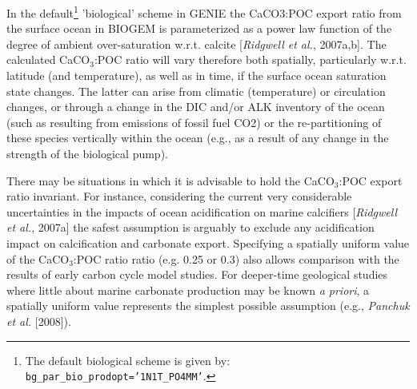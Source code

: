 \documentclass[11pt,fleqn]{book} %
\begin{document}
In the default\footnote{The default biological scheme is given by: \texttt{bg\_par\_bio\_prodopt='1N1T\_PO4MM'}.} 'biological' scheme in GENIE the CaCO3:POC export ratio from the surface ocean in BIOGEM is parameterized as a power law function of the degree of ambient over-saturation w.r.t. calcite [\textit{Ridgwell et al.}, 2007a,b]. The calculated CaCO\begin{math}_3\end{math}:POC ratio will vary therefore both spatially, particularly w.r.t. latitude (and temperature), as well as in time, if the surface ocean saturation state changes. The latter can arise from climatic (temperature) or circulation changes, or through a change in the DIC and/or ALK inventory of the ocean (such as resulting from emissions of fossil fuel CO2) or the re-partitioning of these species vertically within the ocean (e.g., as a result of any change in the strength of the biological pump).

There may be situations in which it is advisable to hold the CaCO\begin{math}_3\end{math}:POC export ratio invariant. For instance, considering the current very considerable uncertainties in the impacts of ocean acidification on marine calcifiers [\textit{Ridgwell et al.}, 2007a] the safest assumption is arguably to exclude any acidification impact on calcification and carbonate export. Specifying a spatially uniform value of the CaCO\begin{math}_3\end{math}:POC ratio ratio (e.g. 0.25 or 0.3) also allows comparison with the results of early carbon cycle model studies. For deeper-time geological studies where little about marine carbonate production may be known \textit{a priori}, a spatially uniform value represents the simplest possible assumption (e.g., \textit{Panchuk et al.} [2008]).
\end{document}
